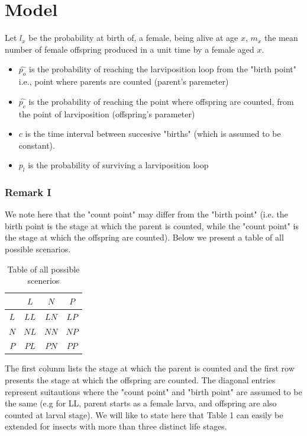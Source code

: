 \documentclass[10pt,a4paper]{article}
\begin{document}
\section*{Model} 

Let  $l_{x}$ be the probability at birth of, a female, being alive at age $x$, $m_{x}$ the mean number of female offspring produced in a unit time by a female aged $x$.  
\begin{itemize}
	\item  $\hat{p_o}$ is the probability of reaching the larviposition loop from the "birth point" i.e., point where parents are counted (parent's paremeter)
   \item   $\hat{p_c}$ is the probability of reaching the point where offspring are counted, from the point of larviposition (offspring's parameter)
    \item   $c$ is the time interval between succesive "births" (which is assumed to be constant). 
   \item   $p_l$ is the probability of surviving a larviposition loop
\end{itemize} 

\newpage
 \subsubsection*{Remark I} 
 
 We note here that the "count point" may differ from the "birth point" (i.e. the birth point is the stage at which the parent is counted, while the "count point" is the stage at which the offspring are counted). Below we present a  table of all possible scenarios. 
 
 
\begin{table}[h!]
	\centering
	\begin{tabular}{ |c|c|c|c| } 
		\hline
		 & $L$ & $N$ & $P$ \\
		\hline
		$L$ & $LL$ & $LN$ & $LP$\\ 
			\hline
		$N$& $NL$ & $NN$ & $NP$\\ 
			\hline
		$P$& $PL$ & $PN$ & $PP$ \\ 
		\hline
	\end{tabular}
\label{table:1}
\caption{Table of all possible scenerios}
\end{table}

The first colunm lists the stage at which the parent is counted and the first row presents the stage at which the offspring are counted. The diagonal entries represent suitautions where the "count point" and "birth point" are assumed to be the same (e.g for LL, parent starts as a female larva, and offspring are also counted at larval stage). We will like to state here that Table 1 can easily be extended for insects with more than three distinct life stages.
\end{document}
